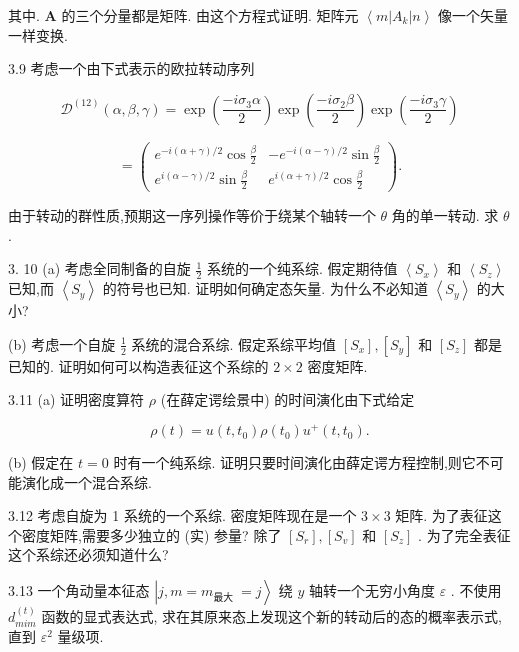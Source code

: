 其中. $\mathbf{A}$ 的三个分量都是矩阵. 由这个方程式证明. 矩阵元 $\left\langle {m\left| {A}_{k}\right| n}\right\rangle$ 像一个矢量一样变换.

3.9 考虑一个由下式表示的欧拉转动序列

$$
{\mathcal{D}}^{\left( 12\right) }\left( {\alpha ,\beta ,\gamma }\right) = \exp \left( \frac{-i{\sigma }_{3}\alpha }{2}\right) \exp \left( \frac{-i{\sigma }_{2}\beta }{2}\right) \exp \left( \frac{-i{\sigma }_{3}\gamma }{2}\right)
$$

$$
= \left( \begin{matrix} {e}^{-i\left( {\alpha + \gamma }\right) /2}\cos \frac{\beta }{2} & - {e}^{-i\left( {\alpha - \gamma }\right) /2}\sin \frac{\beta }{2} \\ {e}^{i\left( {\alpha - \gamma }\right) /2}\sin \frac{\beta }{2} & {e}^{i\left( {\alpha + \gamma }\right) /2}\cos \frac{\beta }{2} \end{matrix}\right) .
$$

由于转动的群性质,预期这一序列操作等价于绕某个轴转一个 $\theta$ 角的单一转动. 求 $\theta$ .

3. 10 (a) 考虑全同制备的自旋 $\frac{1}{2}$ 系统的一个纯系综. 假定期待值 $\left\langle {S}_{x}\right\rangle$ 和 $\left\langle {S}_{z}\right\rangle$ 已知,而 $\left\langle {S}_{y}\right\rangle$ 的符号也已知. 证明如何确定态矢量. 为什么不必知道 $\left\langle {S}_{y}\right\rangle$ 的大小?

(b) 考虑一个自旋 $\frac{1}{2}$ 系统的混合系综. 假定系综平均值 $\left\lbrack {S}_{x}\right\rbrack ,\left\lbrack {S}_{y}\right\rbrack$ 和 $\left\lbrack {S}_{z}\right\rbrack$ 都是已知的. 证明如何可以构造表征这个系综的 $2 \times 2$ 密度矩阵.

3.11 (a) 证明密度算符 $\rho$ (在薛定谔绘景中) 的时间演化由下式给定

$$
\rho \left( t\right) = u\left( {t,{t}_{0}}\right) \rho \left( {t}_{0}\right) {u}^{ + }\left( {t,{t}_{0}}\right) .
$$

(b) 假定在 $t = 0$ 时有一个纯系综. 证明只要时间演化由薛定谔方程控制,则它不可能演化成一个混合系综.

3.12 考虑自旋为 1 系统的一个系综. 密度矩阵现在是一个 $3 \times 3$ 矩阵. 为了表征这个密度矩阵,需要多少独立的 (实) 参量? 除了 $\left\lbrack {S}_{r}\right\rbrack ,\left\lbrack {S}_{v}\right\rbrack$ 和 $\left\lbrack {S}_{z}\right\rbrack$ . 为了完全表征这个系综还必须知道什么?

3.13 一个角动量本征态 $\left| {j, m = {m}_{\text{最大 }} = j}\right\rangle$ 绕 $y$ 轴转一个无穷小角度 $\varepsilon$ . 不使用 ${d}_{mim}^{\left( t\right) }$ 函数的显式表达式, 求在其原来态上发现这个新的转动后的态的概率表示式,直到 ${\varepsilon }^{2}$ 量级项.

